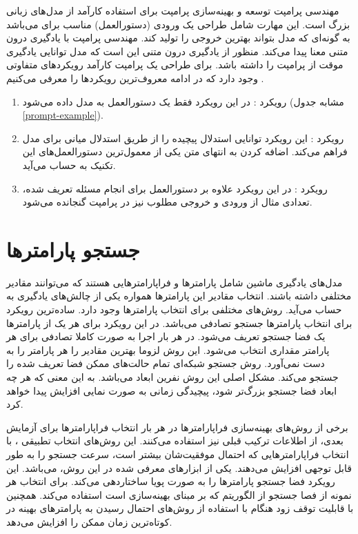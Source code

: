 مهندسی پرامپت
توسعه و بهینه‌سازی پرامپت برای استفاده کارآمد از مدل‌های زبانی بزرگ است. این مهارت شامل طراحی یک ورودی (دستورالعمل) مناسب برای 
می‌باشد به گونه‌ای که مدل بتواند بهترین خروجی را تولید کند. مهندسی پرامپت با یادگیری درون متنی
معنا پیدا می‌کند. منظور از یادگیری درون متنی این است که مدل توانایی یادگیری موقت از پرامپت را داشته باشد. برای طراحی یک پرامپت کارآمد رویکردهای متفاوتی وجود دارد که در ادامه معروف‌ترین رویکردها را معرفی می‌کنیم
.

\begin{enumerate}
	\item رویکرد : 
در این رویکرد فقط یک دستورالعمل به مدل داده می‌شود (مشابه جدول 
\ref{prompt-example}). 
	\item رویکرد :
	این رویکرد توانایی استدلال پیچیده را از طریق استدلال میانی برای مدل فراهم می‌کند. اضافه کردن 
	به انتهای متن یکی از معمول‌ترین دستورالعمل‌های این تکنیک به حساب می‌آید.

	\item رویکرد :
	در این رویکرد علاوه بر دستورالعمل برای انجام مسئله تعریف شده، تعدادی مثال‌ از ورودی و خروجی مطلوب نیز در پرامپت گنجانده می‌شود. 
\end{enumerate}

\section{جستجو پارامترها}
مدل‌های یادگیری ماشین شامل پارامترها و فراپارامترهایی
 هستند که می‌توانند مقادیر مختلفی داشته باشند. انتخاب مقادیر این پارامترها همواره یکی از چالش‌های یادگیری به حساب می‌آید. روش‌های مختلفی برای انتخاب پارامترها وجود دارد. ساده‌ترین رویکرد برای انتخاب پارامترها  جستجو تصادفی
می‌باشد. در این رویکرد برای هر یک از پارامترها یک فضا جستجو تعریف می‌شود. در هر بار اجرا به صورت کاملا تصادفی برای هر پارامتر مقداری انتخاب می‌شود. این روش لزوما بهترین مقادیر را هر پارامتر را به دست نمی‌آورد.
روش جستجو شبکه‌ای 
تمام حالت‌های ممکن فضا تعریف شده را جستجو می‌کند. مشکل اصلی این روش نفرین ابعاد
می‌باشد. به این معنی که هر چه ابعاد فضا جستجو بزرگ‌تر شود، پیچیدگی زمانی به صورت نمایی افزایش پیدا خواهد کرد.


برخی از روش‌های بهینە‌سازی فراپارامترها در هر بار انتخاب فراپارامترها برای آزمایش بعدی، از اطلاعات ترکیب قبلی نیز استفاده می‌کنند. این روش‌های انتخاب تطبیقی
،
با انتخاب فراپارامترهایی که احتمال موفقیت‌شان بیشتر است، سرعت جستجو را به طور قابل توجهی افزایش می‌دهند. یکی از ابزارهای معرفی شده در این روش،
\cite{10.1145/3292500.3330701}
می‌باشد. این رویکرد فضا جستجو پارامترها را به صورت پویا ساختاردهی می‌کند. برای انتخاب هر نمونه از فصا جستجو از الگوریتم
که بر مبنای بهینه‌سازی
است استفاده می‌کند. همچنین 
با قابلیت توقف زود هنگام
با استفاده از روش‌های 
احتمال رسیدن به پارامترهای بهینه در کوتاه‌ترین زمان ممکن را افزایش می‌دهد.

